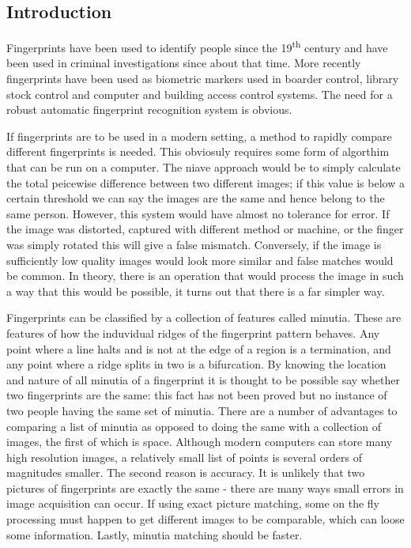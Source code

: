 \documentclass[11pt,a4paper]{article}
\begin{document}
    \begin{multicols}{2}

\section{Introduction}
	Fingerprints have been used to identify people since the 19\textsuperscript{th} century and have been used in criminal investigations since about that time. More recently fingerprints have been used as biometric markers used in boarder control, library stock control and computer and building access control systems. The need for a robust automatic fingerprint recognition system is obvious.

        If fingerprints are to be used in a modern setting, a method to rapidly compare different fingerprints is needed. This obviosuly requires some form of algorthim that can be run on a computer. The niave approach would be to simply calculate the total peicewise difference between two different images; if this value is below a certain threshold we can say the images are the same and hence belong to the same person. However, this system would have almost no tolerance for error. If the image was distorted, captured with different method or machine, or the finger was simply rotated this will give a false mismatch. Conversely, if the image is sufficiently low quality images would look more similar and false matches would be common. In theory, there is an operation that would process the image in such a way that this would be possible, it turns out that there is a far simpler way.

        Fingerprints can be classified by a collection of features called minutia. These are features of how the induvidual ridges of the fingerprint pattern behaves. Any point where a line halts and is not at the edge of a region is a termination, and any point where a ridge splits in two is a bifurcation. By knowing the location and nature of all minutia of a fingerprint it is thought to be possible say whether two fingerprints are the same: this fact has not been proved but no instance of two people having the same set of minutia. There are a number of advantages to comparing a list of minutia as opposed to doing the same with a collection of images, the first of which is space. Although modern computers can store many high resolution images, a relatively small list of points is several orders of magnitudes smaller. The second reason is accuracy. It is unlikely that two pictures of fingerprints are exactly the same - there are many ways small errors in image acquisition can occur. If using exact picture matching, some on the fly processing must happen to get different images to be comparable, which can loose some information. Lastly, minutia matching should be faster.



\end{multicols}
\end{document}
